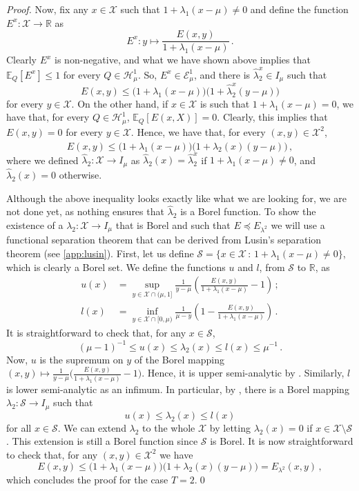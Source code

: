\documentclass[3p, authoryear, 10pt]{elsarticle}%
\newcommand{\E}{\mathbb E}
\newcommand{\Ee}{\mathcal E}
\newcommand{\Hh}{\mathcal H}
\newcommand{\R}{\mathbb R}
\newcommand{\X}{\mathcal X}
\begin{document}
\begin{proof}
Now, fix any $x\in\X$ such that $1+\lambda_1(x-\mu)\neq 0$ and define the function $E^x:\X\to\R$ as $$E^x:y\mapsto \frac{E(x,y)}{1+\lambda_1(x-\mu)}\,.$$ Clearly $E^x$ is non-negative, and what we have shown above implies that $\E_Q[E^x]\leq 1$ for every $Q\in\Hh^1_\mu$. So, $E^x\in\Ee_\mu^1$, and there is $\hat\lambda_2^x\in I_\mu$ such that $$E(x,y)\leq \big(1+\lambda_1(x-\mu)\big)\big(1+\hat\lambda_2^x(y-\mu)\big)$$ for every $y\in\X$. On the other hand, if $x\in\X$ is such that $1+\lambda_1(x-\mu) = 0$, we have that, for every $Q\in\Hh_\mu^1$, $\E_Q[E(x,X)] = 0$. Clearly, this implies that $E(x,y)=0$ for every $y\in\X$. Hence, we have that, for every $(x,y)\in\X^2$, $$E(x, y)\leq \big(1+\lambda_1(x-\mu)\big)\big(1+\hat\lambda_2(x)(y-\mu)\big)\,,$$ where we defined $\hat\lambda_2:\X\to I_\mu$ as $\hat\lambda_2(x) = \hat\lambda_2^x$ if $1+\lambda_1(x-\mu)\neq 0$, and $\hat\lambda_2(x)=0$ otherwise.

Although the above inequality looks exactly like what we are looking for, we are not done yet, as nothing ensures that $\hat\lambda_2$ is a Borel function. To show the existence of a $\lambda_2:\X\to I_\mu$ that is Borel and such that $E\preceq E_{\lambda^2}$ we will use a functional separation theorem that can be derived from Lusin's separation theorem (see \ref{app:lusin}). First, let us define $\mathcal S=\{x\in\X\,:\,1+\lambda_1(x-\mu)\neq 0\}$, which is clearly a Borel set. We define the functions $u$ and $l$, from $\mathcal S$ to $\R$, as 
    \begin{align*}
    	u(x) &=\sup_{y\in\X\cap(\mu,1]}\frac{1}{y-\mu}\left(\frac{E(x,y)}{1+\lambda_1(x-\mu)}-1\right)\,;\\
   	l(x) &= \inf_{y\in\X\cap[0,\mu)}\frac{1}{\mu-y}\left(1-\frac{E(x,y)}{1+\lambda_1(x-\mu)}\right)\,.
    \end{align*}
    It is straightforward to check that, for any $x\in\mathcal S$, 
    $$(\mu-1)^{-1}\leq u(x)\leq \hat\lambda_2(x)\leq l(x)\leq \mu^{-1}\,.$$   
    Now, $u$ is the supremum on $y$ of the Borel mapping $(x,y)\mapsto\frac1{y-\mu}\big(\frac{E(x,y)}{1+\lambda_1(x-\mu)}-1\big)$. Hence, it is upper semi-analytic by . Similarly, $l$ is lower semi-analytic as an infimum. In particular, by , there is a Borel mapping $\lambda_2:\mathcal S\to I_\mu$ such that $$u(x)\leq \lambda_2(x)\leq l(x)$$ for all $x\in\mathcal S$. We can extend $\lambda_2$ to the whole $\X$ by letting $\lambda_2(x)=0$ if $x\in\X\setminus\mathcal S$. This extension is still a Borel function since $\mathcal S$ is Borel. It is now straightforward to check that, for any $(x,y)\in\X^2$ we have
    $$E(x,y)\leq \big(1+\lambda_1(x-\mu)\big)\big(1+\lambda_2(x)(y-\mu)\big) = E_{\lambda^2}(x,y)\,,$$
    which concludes the proof for the case $T=2$.\qed
\end{proof}
\end{document}
